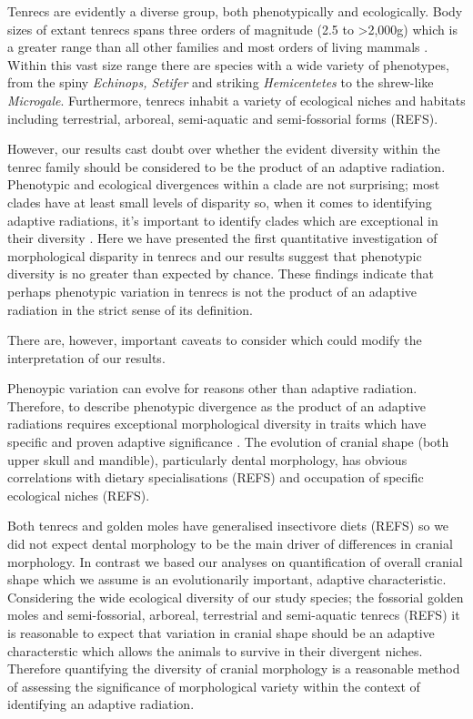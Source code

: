 \documentclass[12pt,a4paper]{article}
\begin{document}
Tenrecs are evidently a diverse group, both phenotypically and ecologically. Body sizes of extant tenrecs spans three orders of magnitude (2.5 to \textgreater 2,000g) which is a greater range than all other families and most orders of living mammals \citep{Olson2003}. Within this vast size range there are species with a wide variety of phenotypes, from the spiny \textit{Echinops, Setifer} and striking \textit{Hemicentetes} to the shrew-like  \textit{Microgale}. Furthermore, tenrecs inhabit a variety of ecological niches and habitats including terrestrial, arboreal, semi-aquatic and semi-fossorial forms (REFS).

However, our results cast doubt over whether the evident diversity within the tenrec family should be considered to be the product of an adaptive radiation. Phenotypic and ecological divergences within a clade are not surprising; most clades have at least small levels of disparity so, when it comes to identifying adaptive radiations, it's important to identify clades which are exceptional in their diversity \citep{Losos2010a}. Here we have presented the first quantitative investigation of morphological disparity in tenrecs and our results suggest that phenotypic diversity is no greater than expected by chance. These findings indicate that perhaps phenotypic variation in tenrecs is not the product of an adaptive radiation in the strict sense of its definition.

There are, however, important caveats to consider which could modify the interpretation of our results.

Phenoypic variation can evolve for reasons other than adaptive radiation. Therefore, to describe phenotypic divergence as the product of an adaptive radiations requires exceptional morphological diversity in traits which have specific and proven adaptive significance \citep{Losos2010a}. The evolution of cranial shape (both upper skull and mandible), particularly dental morphology, has obvious correlations with dietary specialisations (REFS) and occupation of specific ecological niches (REFS). 


Both tenrecs and golden moles have generalised insectivore diets (REFS) so we did not expect dental morphology to be the main driver of differences in cranial morphology. In contrast we based our analyses on quantification of overall cranial shape which we assume is an evolutionarily important, adaptive characteristic. Considering the wide ecological diversity of our study species; the fossorial golden moles and semi-fossorial, arboreal, terrestrial and semi-aquatic tenrecs (REFS) it is reasonable to expect that variation in cranial shape should be an adaptive characterstic which allows the animals to survive in their divergent niches. Therefore quantifying the diversity of cranial morphology is a reasonable method of assessing the significance of morphological variety within the context of identifying an adaptive radiation.
\end{document}
